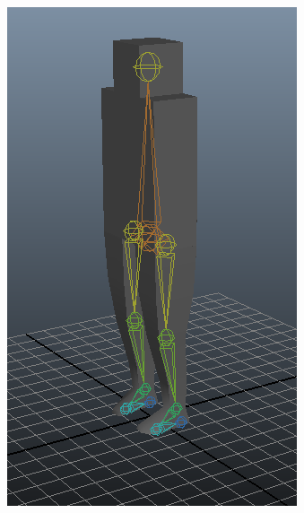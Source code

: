 \begin{figure}[htp]
	\centering
	\begin{subfigure}[b]{0.41\textwidth}
		\includegraphics[width=\textwidth]{images/simpleSkeleton2Screen1Cropped.png}
	\end{subfigure}
	\begin{subfigure}[b]{0.3\textwidth}

\end{subfigure}
\end{figure}
